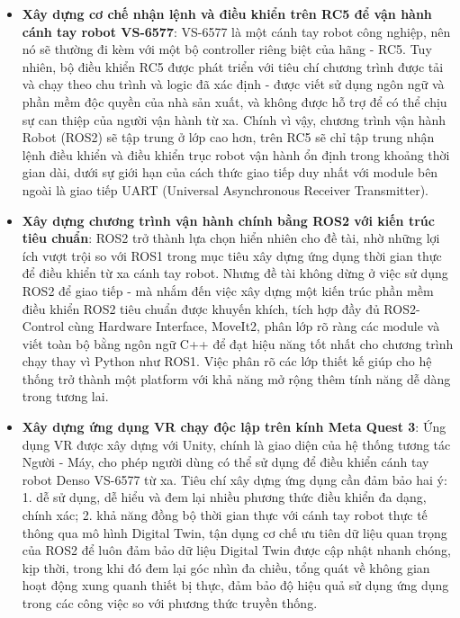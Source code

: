 \begin{itemize}
    \item \textbf{Xây dựng cơ chế nhận lệnh và điều khiển trên RC5 để vận hành cánh tay robot VS-6577}: VS-6577 là một cánh tay robot công nghiệp, nên nó sẽ thường đi kèm với một bộ controller riêng biệt của hãng - RC5. Tuy nhiên, bộ điều khiển RC5 được phát triển với tiêu chí chương trình được tải và chạy theo chu trình và logic đã xác định - được viết sử dụng ngôn ngữ và phần mềm độc quyền của nhà sản xuất, và không được hỗ trợ để có thể chịu sự can thiệp của người vận hành từ xa. Chính vì vậy, chương trình vận hành Robot (ROS2) sẽ tập trung ở lớp cao hơn, trên RC5 sẽ chỉ tập trung nhận lệnh điều khiển và điều khiển trục robot vận hành ổn định trong khoảng thời gian dài, dưới sự giới hạn của cách thức giao tiếp duy nhất với module bên ngoài là giao tiếp UART (Universal Asynchronous Receiver Transmitter).
    \item \textbf{Xây dựng chương trình vận hành chính bằng ROS2 với kiến trúc tiêu chuẩn}: ROS2 trở thành lựa chọn hiển nhiên cho đề tài, nhờ những lợi ích vượt trội so với ROS1 trong mục tiêu xây dựng ứng dụng thời gian thực để điều khiển từ xa cánh tay robot. Nhưng đề tài không dừng ở việc sử dụng ROS2 để giao tiếp - mà nhắm đến việc xây dựng một kiến trúc phần mềm điều khiển ROS2 tiêu chuẩn được khuyến khích, tích hợp đầy đủ ROS2-Control cùng Hardware Interface, MoveIt2, phân lớp rõ ràng các module và viết toàn bộ bằng ngôn ngữ C++ để đạt hiệu năng tốt nhất cho chương trình chạy thay vì Python như ROS1. Việc phân rõ các lớp thiết kế giúp cho hệ thống trở thành một platform với khả năng mở rộng thêm tính năng dễ dàng trong tương lai.
    \item \textbf{Xây dựng ứng dụng VR chạy độc lập trên kính Meta Quest 3}: Ứng dụng VR được xây dựng với Unity, chính là giao diện của hệ thống tương tác Người - Máy, cho phép người dùng có thể sử dụng để điều khiển cánh tay robot Denso VS-6577 từ xa. Tiêu chí xây dựng ứng dụng cần đảm bảo hai ý: 1. dễ sử dụng, dễ hiểu và đem lại nhiều phương thức điều khiển đa dạng, chính xác; 2. khả năng đồng bộ thời gian thực với cánh tay robot thực tế thông qua mô hình Digital Twin, tận dụng cơ chế ưu tiên dữ liệu quan trọng của ROS2 để luôn đảm bảo dữ liệu Digital Twin được cập nhật nhanh chóng, kịp thời, trong khi đó đem lại góc nhìn đa chiều, tổng quát về không gian hoạt động xung quanh thiết bị thực, đảm bảo độ hiệu quả sử dụng ứng dụng trong các công việc so với phương thức truyền thống.
\end{itemize}


